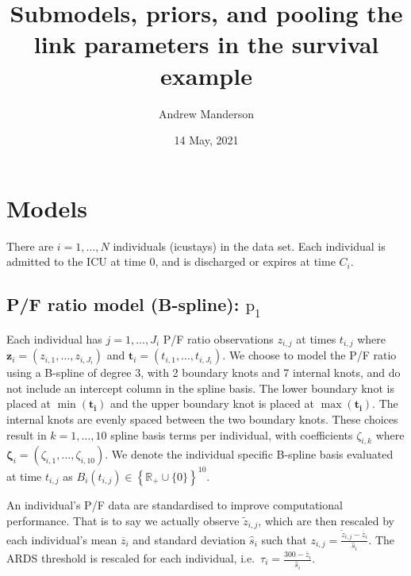 \documentclass[
  10pt,
  a4paper,
]{article}
\title{Submodels, priors, and pooling the link parameters in the
survival example}
\author{Andrew Manderson}
\date{14 May, 2021}
\newcommand{\pd}{\text{p}}
\begin{document}
\maketitle

\hypertarget{models}{%
\section{Models}\label{models}}

There are \(i = 1, \ldots, N\) individuals (icustays) in the data set.
Each individual is admitted to the ICU at time \(0\), and is discharged
or expires at time \(C_{i}\).

\hypertarget{pf-ratio-model-b-spline-pd_1}{%
\subsection{\texorpdfstring{P/F ratio model (B-spline):
\(\pd_{1}\)}{P/F ratio model (B-spline): \textbackslash pd\_\{1\}}}\label{pf-ratio-model-b-spline-pd_1}}

Each individual has \(j = 1, \ldots, J_{i}\) P/F ratio observations
\(z_{i, j}\) at times \(t_{i, j}\) where
\(\boldsymbol{z}_{i} = (z_{i, 1}, \ldots, z_{i, J_{i}})\) and
\(\boldsymbol{t}_{i} = (t_{i, 1}, \ldots, t_{i, J_{i}})\). We choose to
model the P/F ratio using a B-spline of degree 3, with 2 boundary knots
and 7 internal knots, and do not include an intercept column in the
spline basis. The lower boundary knot is placed at
\(\min(\boldsymbol{t_{i}})\) and the upper boundary knot is placed at
\(\max(\boldsymbol{t_{i}})\). The internal knots are evenly spaced
between the two boundary knots. These choices result in
\(k = 1, \ldots, 10\) spline basis terms per individual, with
coefficients \(\zeta_{i, k}\) where
\(\boldsymbol{\zeta}_{i} = (\zeta_{i, 1}, \ldots, \zeta_{i, 10})\). We
denote the individual specific B-spline basis evaluated at time
\(t_{i, j}\) as
\(B_{i}(t_{i, j}) \in \left\{\mathbb{R}_{+} \cup \{0\}\right\}^{10}\).

An individual's P/F data are standardised to improve computational
performance. That is to say we actually observe \(\tilde{z}_{i, j}\),
which are then rescaled by each individual's mean \(\overline{z}_{i}\)
and standard deviation \(\hat{s}_{i}\) such that
\(z_{i, j} = \frac{\tilde{z}_{i, j} - \overline{z}_{i}}{\hat{s}_{i}}\).
The ARDS threshold is rescaled for each individual,
i.e.~\(\tau_{i} = \frac{300 - \overline{z}_{i}}{\hat{s}_{i}}\).
\end{document}
